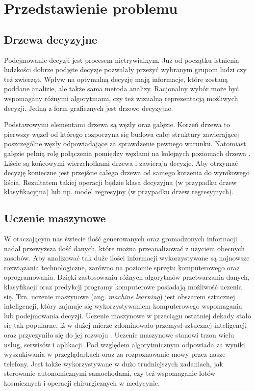 \chapter{Przedstawienie problemu}

\section{Drzewa decyzyjne}


Podejmowanie decyzji jest procesem nietrywialnym. Już od początku istnienia ludzkości dobrze podjęte decyzje pozwalały przeżyć wybranym grupom ludzi czy też zwierząt. Wpływ na optymalną decyzję mają informacje, które zostaną poddane analizie, ale także sama metoda analizy. Racjonalny wybór może być wspomagany różnymi algorytmami, czy też wizualną reprezentacją możliwych decyzji. Jedną z form graficznych jest drzewo decyzyjne.

Podstawowymi elementami drzewa są węzły oraz gałęzie. Korzeń drzewa to pierwszy węzeł od którego rozpoczyna się budowa całej struktury zawierającej poszczególne węzły odpowiadające za sprawdzenie pewnego warunku. Natomiast gałęzie pełnią rolę połączenia pomiędzy węzłami na kolejnych poziomach drzewa \cite{misc_1}.  Liście są końcowymi wierzchołkami drzewa i zawierają decyzje. Aby otrzymać decyzję konieczne jest przejście całego drzewa od samego korzenia do wynikowego liścia. Rezultatem takiej operacji będzie klasa decyzyjna (w przypadku drzew klasyfikacyjna) lub np. model regresyjny (w przypadku drzew regresyjnych).

\section{Uczenie maszynowe}
W otaczającym nas świecie ilość generowanych oraz gromadzonych informacji nadal przewyższa ilość danych, które można przeanalizować z użyciem obecnych zasobów. Aby analizować tak duże ilości informacji wykorzystywane są najnowsze rozwiązania technologiczne, zarówno na poziomie sprzętu komputerowego oraz oprogramowania. Dzięki zastosowaniu różnych algorytmów przetwarzania danych, klasyfikacji oraz predykcji programy komputerowe posiadają możliwość uczenia się. Tzn. uczenie maszynowe (ang. \textit{machine learning}) jest obszarem sztucznej inteligencji, który zajmuje się wykorzystywaniem komputerowego wspomagania lub podejmowania decyzji. Uczenie maszynowe w przeciągu ostatniej dekady stało się tak popularne, iż w dużej mierze zdominowało przemysł sztucznej inteligencji oraz przyczyniło się do jej rozwoju \cite{book_1}. Uczenie maszynowe stanowi trzon wielu usług, serwisów i aplikacji. Pod względem algorytmicznym odpowiada za wyniki wyszukiwania w przeglądarkach oraz za rozpoznawanie mowy przez nasze telefony. Jest także wykorzystywane w dużo trudniejszych zadaniach, jak sterowanie autonomicznymi samochodami, czy też wspomaganie lotów kosmicznych i operacji chirurgicznych w medycynie.

